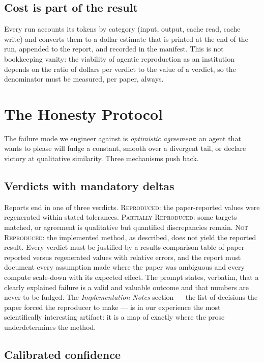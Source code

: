 \documentclass[10pt]{article}
\newcommand{\verdict}[1]{\textsc{#1}}
\begin{document}
\subsection{Cost is part of the result}

Every run accounts its tokens by category (input, output, cache read, cache write) and converts them to a dollar estimate that is printed at the end of the run, appended to the report, and recorded in the manifest. This is not bookkeeping vanity: the viability of agentic reproduction as an institution depends on the ratio of dollars per verdict to the value of a verdict, so the denominator must be measured, per paper, always.

\section{The Honesty Protocol}\label{sec:honesty}

The failure mode we engineer against is \emph{optimistic agreement}: an agent that wants to please will fudge a constant, smooth over a divergent tail, or declare victory at qualitative similarity. Three mechanisms push back.

\subsection{Verdicts with mandatory deltas}

Reports end in one of three verdicts. \verdict{Reproduced}: the paper-reported values were regenerated within stated tolerances. \verdict{Partially Reproduced}: some targets matched, or agreement is qualitative but quantified discrepancies remain. \verdict{Not Reproduced}: the implemented method, as described, does not yield the reported result. Every verdict must be justified by a results-comparison table of paper-reported versus regenerated values with relative errors, and the report must document every assumption made where the paper was ambiguous and every compute scale-down with its expected effect. The prompt states, verbatim, that a clearly explained failure is a valid and valuable outcome and that numbers are never to be fudged. The \emph{Implementation Notes} section --- the list of decisions the paper forced the reproducer to make --- is in our experience the most scientifically interesting artifact: it is a map of exactly where the prose underdetermines the method.

\subsection{Calibrated confidence}
\end{document}
